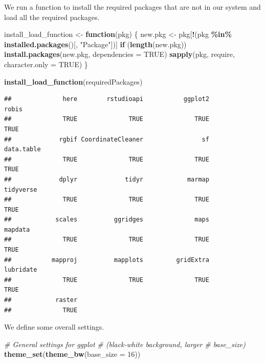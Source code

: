 \documentclass[
]{book}
\newenvironment{Shaded}{\begin{snugshade}}{\end{snugshade}}
\newcommand{\AttributeTok}[1]{\textcolor[rgb]{0.13,0.29,0.53}{#1}}
\newcommand{\CommentTok}[1]{\textcolor[rgb]{0.56,0.35,0.01}{\textit{#1}}}
\newcommand{\ConstantTok}[1]{\textcolor[rgb]{0.56,0.35,0.01}{#1}}
\newcommand{\ControlFlowTok}[1]{\textcolor[rgb]{0.13,0.29,0.53}{\textbf{#1}}}
\newcommand{\DecValTok}[1]{\textcolor[rgb]{0.00,0.00,0.81}{#1}}
\newcommand{\FunctionTok}[1]{\textcolor[rgb]{0.13,0.29,0.53}{\textbf{#1}}}
\newcommand{\NormalTok}[1]{#1}
\newcommand{\OtherTok}[1]{\textcolor[rgb]{0.56,0.35,0.01}{#1}}
\newcommand{\SpecialCharTok}[1]{\textcolor[rgb]{0.81,0.36,0.00}{\textbf{#1}}}
\newcommand{\StringTok}[1]{\textcolor[rgb]{0.31,0.60,0.02}{#1}}
\begin{document}
We run a function to install the required packages that are not in our system and load all the required packages.

\begin{Shaded}
\begin{Highlighting}[]
\NormalTok{install\_load\_function }\OtherTok{\textless{}{-}} \ControlFlowTok{function}\NormalTok{(pkg) \{}
\NormalTok{    new.pkg }\OtherTok{\textless{}{-}}\NormalTok{ pkg[}\SpecialCharTok{!}\NormalTok{(pkg }\SpecialCharTok{\%in\%} \FunctionTok{installed.packages}\NormalTok{()[,}
        \StringTok{"Package"}\NormalTok{])]}
    \ControlFlowTok{if}\NormalTok{ (}\FunctionTok{length}\NormalTok{(new.pkg))}
        \FunctionTok{install.packages}\NormalTok{(new.pkg, }\AttributeTok{dependencies =} \ConstantTok{TRUE}\NormalTok{)}
    \FunctionTok{sapply}\NormalTok{(pkg, require, }\AttributeTok{character.only =} \ConstantTok{TRUE}\NormalTok{)}
\NormalTok{\}}

\FunctionTok{install\_load\_function}\NormalTok{(requiredPackages)}
\end{Highlighting}
\end{Shaded}

\begin{verbatim}
##              here        rstudioapi           ggplot2             robis 
##              TRUE              TRUE              TRUE              TRUE 
##             rgbif CoordinateCleaner                sf        data.table 
##              TRUE              TRUE              TRUE              TRUE 
##             dplyr             tidyr            marmap         tidyverse 
##              TRUE              TRUE              TRUE              TRUE 
##            scales          ggridges              maps           mapdata 
##              TRUE              TRUE              TRUE              TRUE 
##           mapproj          mapplots         gridExtra         lubridate 
##              TRUE              TRUE              TRUE              TRUE 
##            raster 
##              TRUE
\end{verbatim}

We define some overall settings.

\begin{Shaded}
\begin{Highlighting}[]
\CommentTok{\# General settings for ggplot}
\CommentTok{\# (black{-}white background, larger}
\CommentTok{\# base\_size)}
\FunctionTok{theme\_set}\NormalTok{(}\FunctionTok{theme\_bw}\NormalTok{(}\AttributeTok{base\_size =} \DecValTok{16}\NormalTok{))}
\end{Highlighting}
\end{Shaded}
\end{document}
